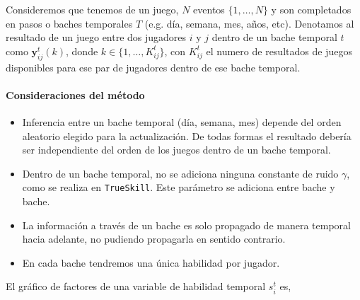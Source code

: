 \documentclass[11pt,twoside,spanish]{report} %
\newcommand{\vm}[1]{\mathbf{#1}}
\begin{document}
Consideremos que tenemos de un juego, $N$ eventos $\{1, \dots, N\}$ y son completados en pasos o baches temporales $T$ (e.g. d\'ia, semana, mes, a\~nos, etc).
Denotamos al resultado de un juego entre dos jugadores $i$ y $j$ dentro de un bache temporal $t$ como $\vm{y}^t_{ij}(k)$, donde $k \in \{1,\dots,K^t_{ij}\}$, con $K^t_{ij}$ el numero de resultados de juegos disponibles para ese par de jugadores dentro de ese bache temporal.

\paragraph{Consideraciones del m\'etodo}
\begin{itemize}
	\item Inferencia entre un bache temporal (d\'ia, semana, mes) depende del orden aleatorio elegido para la actualizaci\'on. De todas formas el resultado deber\'ia ser independiente del orden de los juegos dentro de un bache temporal.
	\item Dentro de un bache temporal, no se adiciona ninguna constante de ruido $\gamma$, como se realiza en \texttt{TrueSkill}. 
	Este par\'ametro se adiciona entre bache y bache.
	\item La informaci\'on a trav\'es de un bache es solo propagado de manera temporal hacia adelante, no pudiendo propagarla en sentido contrario.
	\item En cada bache tendremos una \'unica habilidad por jugador.
\end{itemize}

El gr\'afico de factores de una variable de habilidad temporal $s_i^t$ es,
\end{document}
